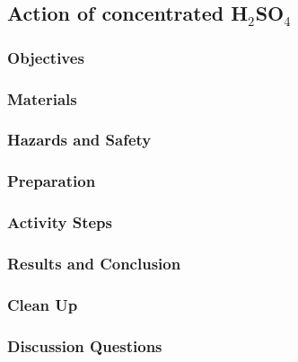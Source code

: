 \subsection{Action of concentrated H$_{2}$SO$_{4}$}

\subsubsection{Objectives}


\subsubsection{Materials}


\subsubsection{Hazards and Safety}


\subsubsection{Preparation}
\begin{enumerate}
\end{enumerate}

\subsubsection{Activity Steps}
\begin{enumerate}
\end{enumerate}

\subsubsection{Results and Conclusion}


\subsubsection{Clean Up}
\begin{enumerate}
\end{enumerate}


\subsubsection{Discussion Questions}
\begin{enumerate}
\end{enumerate}

